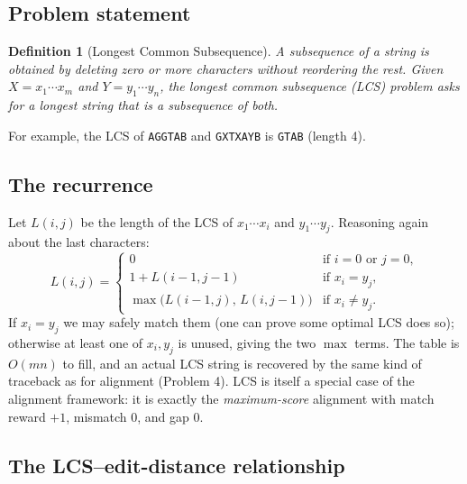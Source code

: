 \documentclass[11pt]{article}
\newtheorem{definition}[theorem]{Definition}
\begin{document}
\subsection{Problem statement}

\begin{definition}[Longest Common Subsequence]
A \emph{subsequence} of a string is obtained by deleting zero or more characters without
reordering the rest. Given $X = x_1\cdots x_m$ and $Y = y_1\cdots y_n$, the \emph{longest
common subsequence (LCS)} problem asks for a longest string that is a subsequence of both.
\end{definition}

For example, the LCS of \texttt{AGGTAB} and \texttt{GXTXAYB} is \texttt{GTAB} (length 4).

\subsection{The recurrence}

Let $L(i,j)$ be the length of the LCS of $x_1\cdots x_i$ and $y_1\cdots y_j$. Reasoning
again about the last characters:
\[
L(i,j) = \begin{cases}
0 & \text{if } i = 0 \text{ or } j = 0,\\
1 + L(i-1, j-1) & \text{if } x_i = y_j,\\
\max\big(L(i-1, j),\, L(i, j-1)\big) & \text{if } x_i \ne y_j.
\end{cases}
\]
If $x_i = y_j$ we may safely match them (one can prove some optimal LCS does so); otherwise
at least one of $x_i, y_j$ is unused, giving the two $\max$ terms. The table is $O(mn)$ to
fill, and an actual LCS string is recovered by the same kind of traceback as for alignment
(Problem 4). LCS is itself a special case of the alignment framework: it is exactly the
\emph{maximum-score} alignment with match reward $+1$, mismatch $0$, and gap $0$.

\subsection{The LCS--edit-distance relationship}
\end{document}
